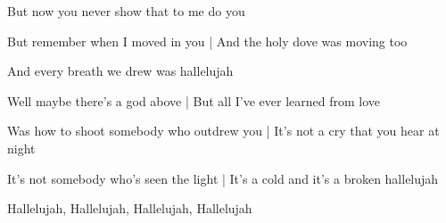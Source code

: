 But now you never show that to me do you \hrulefill

But remember when I moved in you | And the holy dove was moving too

And every breath we drew was hallelujah

Well maybe there's a god above | But all I've ever learned from love

Was how to shoot somebody who outdrew you | It's not a cry that you hear at night

It's not somebody who's seen the light | It's a cold and it's a broken hallelujah

Hallelujah, Hallelujah, Hallelujah, Hallelujah \hrulefill